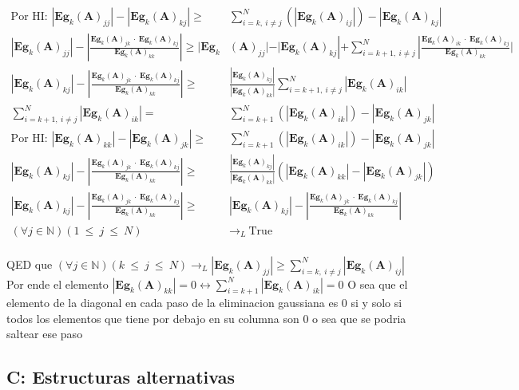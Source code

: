 \begin{align*}
    \text{Por HI: } |\textbf{Eg}_{k}(\textbf{A})_{jj}| - |\textbf{Eg}_{k}(\textbf{A})_{kj}| \geq &\sum_{i=k, \ i \neq j}^{N} (|\textbf{Eg}_{k}(\textbf{A})_{ij}|) -  |\textbf{Eg}_{k}(\textbf{A})_{kj}|\\
    |\textbf{Eg}_{k}(\textbf{A})_{jj}| - |\frac {\textbf{Eg}_{k}(\textbf{A})_{jk} \ \cdot \ \textbf{Eg}_{k}(\textbf{A})_{kj}}{\textbf{Eg}_{k}(\textbf{A})_{kk}}| \geq |\textbf{Eg}_{k}&(\textbf{A})_{jj}| - |\textbf{Eg}_{k}(\textbf{A})_{kj}| +  \sum_{i=k+1, \ i \neq j}^{N} |\frac{\textbf{Eg}_{k}(\textbf{A})_{ik} \ \cdot \ \textbf{Eg}_{k}(\textbf{A})_{kj}}{\textbf{Eg}_{k}(\textbf{A})_{kk}}| \\
    |\textbf{Eg}_{k}(\textbf{A})_{kj}| - |\frac {\textbf{Eg}_{k}(\textbf{A})_{jk} \ \cdot \ \textbf{Eg}_{k}(\textbf{A})_{kj}}{\textbf{Eg}_{k}(\textbf{A})_{kk}}| \geq  &\frac{ |\textbf{Eg}_{k}(\textbf{A})_{kj}|}{|\textbf{Eg}_{k}(\textbf{A})_{kk}|} \sum_{i=k+1, \ i \neq j}^{N} |\textbf{Eg}_{k}(\textbf{A})_{ik}|\\
    \sum_{i=k+1, \ i \neq j}^{N} |\textbf{Eg}_{k}(\textbf{A})_{ik}| = &\sum_{i=k+1}^{N} (|\textbf{Eg}_{k}(\textbf{A})_{ik}|) -  |\textbf{Eg}_{k}(\textbf{A})_{jk}|\\
    \text{Por HI: } |\textbf{Eg}_{k}(\textbf{A})_{kk}| -  |\textbf{Eg}_{k}(\textbf{A})_{jk}| \geq &\sum_{i=k+1}^{N} (|\textbf{Eg}_{k}(\textbf{A})_{ik}|) -  |\textbf{Eg}_{k}(\textbf{A})_{jk}|\\
    |\textbf{Eg}_{k}(\textbf{A})_{kj}| - |\frac {\textbf{Eg}_{k}(\textbf{A})_{jk} \ \cdot \ \textbf{Eg}_{k}(\textbf{A})_{kj}}{\textbf{Eg}_{k}(\textbf{A})_{kk}}| \geq  &\frac{ |\textbf{Eg}_{k}(\textbf{A})_{kj}|}{|\textbf{Eg}_{k}(\textbf{A})_{kk}|} (|\textbf{Eg}_{k}(\textbf{A})_{kk}| -  |\textbf{Eg}_{k}(\textbf{A})_{jk}|)\\
    |\textbf{Eg}_{k}(\textbf{A})_{kj}| - |\frac {\textbf{Eg}_{k}(\textbf{A})_{jk} \ \cdot \ \textbf{Eg}_{k}(\textbf{A})_{kj}}{\textbf{Eg}_{k}(\textbf{A})_{kk}}| \geq  &|\textbf{Eg}_{k}(\textbf{A})_{kj}| - |\frac {\textbf{Eg}_{k}(\textbf{A})_{jk} \ \cdot \ \textbf{Eg}_{k}(\textbf{A})_{kj}}{\textbf{Eg}_{k}(\textbf{A})_{kk}}|\\
    (\forall j \in 	\mathbb{N}) (1 \ \leq \ j \ \leq \ N ) &\longrightarrow_L \ \text{True} \\ 
\end{align*}

QED que $(\forall j \in \mathbb{N}) (k \ \leq \ j \ \leq \ N ) \longrightarrow_L |\textbf{Eg}_{k}(\textbf{A})_{jj}| \geq \sum_{i=k, \ i \neq j}^{N} |\textbf{Eg}_{k}(\textbf{A})_{ij}|$\\
Por ende el elemento $|\textbf{Eg}_{k}(\textbf{A})_{kk}| = 0 \leftrightarrow \sum_{i=k+1}^{N} |\textbf{Eg}_{k}(\textbf{A})_{ik}| = 0$
O sea que el elemento de la diagonal en cada paso de la eliminacion gaussiana es 0 si y solo si todos los elementos que tiene por debajo en su columna son 0 o sea que se podria saltear ese paso


 


\subsection{C: Estructuras alternativas}\label{A.3}